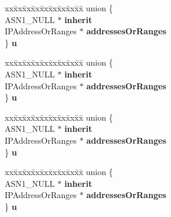 \begin{DoxyCompactItemize}
\begin{tabbing}
\end{tabbing}\item 
\mbox{\label{structIPAddressChoice__st_a1709bca3738baa8e5d6fb3acece59e05}} 
\begin{tabbing}
xx\=xx\=xx\=xx\=xx\=xx\=xx\=xx\=xx\=\kill
union \{\\
\>ASN1\_NULL $\ast$ {\bfseries inherit}\\
\>IPAddressOrRanges $\ast$ {\bfseries addressesOrRanges}\\
\} {\bfseries u}\\

\end{tabbing}\item 
\mbox{\label{structIPAddressChoice__st_ac403f626cc1c73b893ac9f66b7fdc010}} 
\begin{tabbing}
xx\=xx\=xx\=xx\=xx\=xx\=xx\=xx\=xx\=\kill
union \{\\
\>ASN1\_NULL $\ast$ {\bfseries inherit}\\
\>IPAddressOrRanges $\ast$ {\bfseries addressesOrRanges}\\
\} {\bfseries u}\\

\end{tabbing}\item 
\mbox{\label{structIPAddressChoice__st_a16a6571a6ab9009be327fc14b9dc1138}} 
\begin{tabbing}
xx\=xx\=xx\=xx\=xx\=xx\=xx\=xx\=xx\=\kill
union \{\\
\>ASN1\_NULL $\ast$ {\bfseries inherit}\\
\>IPAddressOrRanges $\ast$ {\bfseries addressesOrRanges}\\
\} {\bfseries u}\\

\end{tabbing}\item 
\mbox{\label{structIPAddressChoice__st_a9d81fdb0ea7ae9a005b81a46a1a477b8}} 
\begin{tabbing}
xx\=xx\=xx\=xx\=xx\=xx\=xx\=xx\=xx\=\kill
union \{\\
\>ASN1\_NULL $\ast$ {\bfseries inherit}\\
\>IPAddressOrRanges $\ast$ {\bfseries addressesOrRanges}\\
\} {\bfseries u}\\


\end{tabbing}
\end{DoxyCompactItemize}
